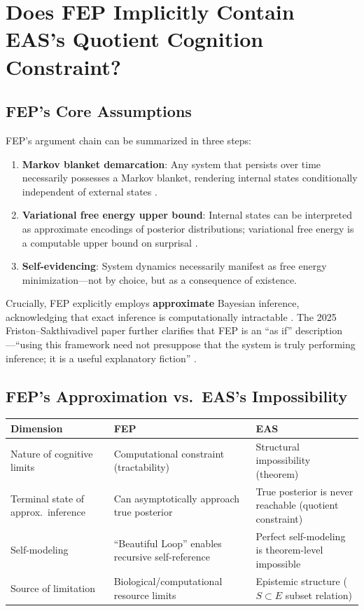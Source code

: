 \documentclass[11pt,a4paper]{article}
\begin{document}
\section{Does FEP Implicitly Contain EAS's Quotient Cognition Constraint?}

\subsection{FEP's Core Assumptions}

FEP's argument chain can be summarized in three steps:

\begin{enumerate}[leftmargin=*]
\item \textbf{Markov blanket demarcation}: Any system that persists over time necessarily possesses a Markov blanket, rendering internal states conditionally independent of external states \cite{friston2019}.

\item \textbf{Variational free energy upper bound}: Internal states can be interpreted as approximate encodings of posterior distributions; variational free energy is a computable upper bound on surprisal \cite{friston2013}.

\item \textbf{Self-evidencing}: System dynamics necessarily manifest as free energy minimization---not by choice, but as a consequence of existence.
\end{enumerate}

Crucially, FEP explicitly employs \textbf{approximate} Bayesian inference, acknowledging that exact inference is computationally intractable \cite{friston2013}. The 2025 Friston--Sakthivadivel paper further clarifies that FEP is an ``as if'' description---``using this framework need not presuppose that the system is truly performing inference; it is a useful explanatory fiction'' \cite{friston2025}.

\subsection{FEP's Approximation vs.\ EAS's Impossibility}

\begin{center}
\begin{tabular}{@{}lll@{}}
\toprule
\textbf{Dimension} & \textbf{FEP} & \textbf{EAS} \\
\midrule
Nature of cognitive limits & Computational constraint (tractability) & Structural impossibility (theorem) \\
Terminal state of approx.\ inference & Can asymptotically approach true posterior & True posterior is never reachable (quotient constraint) \\
Self-modeling & ``Beautiful Loop'' enables recursive self-reference & Perfect self-modeling is theorem-level impossible \\
Source of limitation & Biological/computational resource limits & Epistemic structure ($S \subset E$ subset relation) \\
\bottomrule
\end{tabular}
\end{center}
\end{document}
